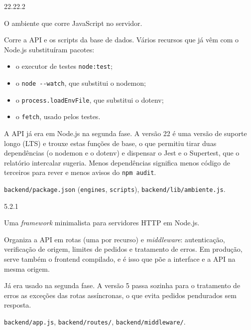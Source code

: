\documentclass[a4paper,12pt]{article}
\newenvironment{ficha}[2]{%
  \par\needspace{7\baselineskip}\medskip\noindent{\large\bfseries #1}\hfill{\small\color{gray!70!black}#2}\par\nopagebreak\smallskip
  \begin{description}[leftmargin=3.1cm,labelwidth=2.8cm,labelsep=0.3cm,font=\normalfont\bfseries\small,itemsep=2pt,topsep=2pt,before=\raggedright]
}{\end{description}\medskip}
\begin{document}
\begin{ficha}{Node.js 22}{22.22.2}
  \item[O que é] O ambiente que corre JavaScript no servidor.
  \item[Para que serviu] Corre a API e os scripts da base de dados. Vários recursos que já vêm com o Node.js substituíram pacotes:
  \begin{itemize}
    \item o executor de testes \texttt{node:test};
    \item o \texttt{node -{}-watch}, que substitui o nodemon;
    \item o \texttt{process.loadEnvFile}, que substitui o dotenv;
    \item o \texttt{fetch}, usado pelos testes.
  \end{itemize}
  \item[Porquê] A API já era em Node.js na segunda fase. A versão 22 é uma versão de suporte longo (LTS) e trouxe estas funções de base, o que permitiu tirar duas dependências (o nodemon e o dotenv) e dispensar o Jest e o Supertest, que o relatório intercalar sugeria. Menos dependências significa menos código de terceiros para rever e menos avisos do \texttt{npm audit}.
  \item[Onde está] \texttt{backend/package.json} (\texttt{engines}, \texttt{scripts}), \texttt{backend/lib/ambiente.js}.
\end{ficha}

\begin{ficha}{Express 5}{5.2.1}
  \item[O que é] Uma \textit{framework} minimalista para servidores HTTP em Node.js.
  \item[Para que serviu] Organiza a API em rotas (uma por recurso) e \textit{middleware}: autenticação, verificação de origem, limites de pedidos e tratamento de erros. Em produção, serve também o frontend compilado, e é isso que põe a interface e a API na mesma origem.
  \item[Porquê] Já era usado na segunda fase. A versão 5 passa sozinha para o tratamento de erros as exceções das rotas assíncronas, o que evita pedidos pendurados sem resposta.
  \item[Onde está] \texttt{backend/app.js}, \texttt{backend/routes/}, \texttt{backend/middleware/}.
\end{ficha}
\end{document}
